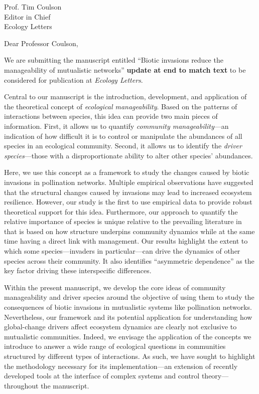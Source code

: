 \documentclass[12pt, a4paper]{letter}
\begin{document}
\begin{letter}{
       Prof. Tim Coulson\\
       Editor in Chief\\
       Ecology Letters}

\opening{Dear Professor Coulson,}

We are submitting the manuscript entitled ``Biotic invasions reduce the
manageability of mutualistic networks'' {\bf update at end to match text} to
be considered for publication at \emph{Ecology Letters}.

Central to our manuscript is the introduction, development, and application of
the theoretical concept of \emph{ecological manageability}. Based on the
patterns of interactions between species, this idea can provide two main
pieces of information. First, it allows us to quantify \textit{community
manageability}---an indication of how difficult it is to control or manipulate
the abundances of all species in an ecological community. Second, it allows us
to identify the \textit{driver species}---those with a disproportionate
ability to alter other species' abundances.

Here, we use this concept as a framework to study the changes caused by biotic
invasions in pollination networks. Multiple empirical observations have
suggested that the structural changes caused by invasions may lead to
increased ecosystem resilience. However, our study is the first to use empirical data
to provide robust theoretical support for this idea. Furthermore, our
approach to quantify the relative importance of species is unique relative to the prevailing literature in that is
based on how structure underpins community dynamics while at the same
time having a direct link with management. Our results highlight the
extent to which some species---invaders in particular---can drive the
dynamics of other species across their community. It also identifies
``asymmetric dependence'' as the key factor driving these interspecific
differences.

Within the present manuscript, we develop the core ideas of community
manageability and driver species around the objective of using them to study
the consequences of biotic invasions in mutualistic systems like pollination
networks. Nevertheless, our framework and its potential application for
understanding how global-change drivers affect ecosystem dynamics are clearly
not exclusive to mutualistic communities. Indeed, we envisage the application
of the concepts we introduce to answer a wide range of ecological questions in
communities structured by different types of interactions. As such, we have
sought to highlight the methodology necessary for its implementation---an
extension of recently developed tools at the interface of complex systems and
control theory---throughout the manuscript.


\end{letter}
\end{document}
